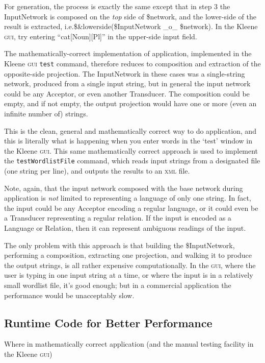\documentclass[letterpaper,12pt]{article}
\providecommand{\acro}{}\renewcommand{\acro}{\textsc}
\begin{document}
\noindent
For generation, the process is exactly the same except that in step 3 the InputNetwork is composed on the \emph{top}
side of \$network, and the lower-side of the result is extracted, i.e.\@ \$\&lowerside(\$InputNetwork
\_o\_ \$network).
In the Kleene \acro{gui}, try entering ``cat[Noun][Pl]'' in the upper-side input field.  

The mathematically-correct implementation of application, implemented in the Kleene \acro{gui}
\texttt{test} command, therefore reduces to 
composition and
extraction of the opposite-side projection.  The InputNetwork in these cases was a single-string
network, produced from a single input string, but in general the input network could be any Acceptor,
or even another Transducer.  The composition could be empty, and if not empty, the output projection
would have one or more (even an infinite number of) strings.

This is the clean, general and mathematically correct way to do application, and this is literally what is
happening when you enter words in the `test' window in the Kleene \acro{gui}.  This same
mathematically correct approach is used to implement the
\texttt{testWordlistFile} command, which reads input strings from a designated file (one string per line), and outputs
the results to an \acro{xml} file.

Note, again, that the input network composed with the base network during application is \emph{not} limited to
representing a language of only one string.  In fact, the input could be any Acceptor encoding a regular language, or it
could even be a Transducer representing a regular relation.  If the input
is encoded as a
Language or Relation, then it can represent ambiguous readings of the input.

The only problem with this approach is that building the \$InputNetwork, performing a composition,
extracting one projection, and walking it to produce the output strings, is all rather expensive
computationally.  In the \acro{gui}, where the user is typing in one input string at a time, or
where the input is in a relatively small wordlist file, it's good enough;
but in a commercial application the performance would be unacceptably slow.

\subsection{Runtime Code for Better Performance}

Where in mathematically correct application (and the manual testing facility in the Kleene \acro{gui}) 
\end{document}
